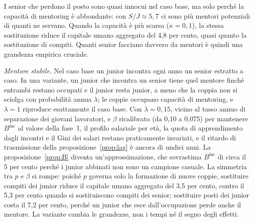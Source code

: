 \documentclass[preprint,12pt,authoryear]{elsarticle}
\begin{document}
I senior che perdono il posto sono quasi innocui nel caso base, ma solo perché la capacità di mentoring è abbondante: con $S/J\approx5{,}7$ ci sono più mentori potenziali di quanti ne servano. Quando la capacità è più scarsa ($\kappa=0{,}1$), la stessa sostituzione riduce il capitale umano aggregato del 4,8 per cento, quasi quanto la sostituzione di compiti. Quanti senior facciano davvero da mentori è quindi una grandezza empirica cruciale.

\emph{Mentore stabile.} Nel caso base un junior incontra ogni anno un senior estratto a caso. In una variante, un junior che incontra un senior tiene quel mentore finché entrambi restano occupati e il junior resta junior, a meno che la coppia non si sciolga con probabilità annua $\lambda$; le coppie occupano capacità di mentoring, e $\lambda=1$ riproduce esattamente il caso base. Con $\lambda=0{,}15$, vicino al tasso annuo di separazione dei giovani lavoratori, e $\beta$ ricalibrato (da 0,10 a 0,075) per mantenere $B^{\mathrm{inc}}$ al valore della fase~1, il profilo salariale per età, la quota di apprendimento dagli incontri e il Gini dei salari restano praticamente invariati, e il ritardo di trasmissione della proposizione~\ref{prop:lag} è ancora di undici anni. La proposizione~\ref{prop:B} diventa un'approssimazione, che sovrastima $B^{\mathrm{inc}}$ di circa il 5 per cento perché i junior abbinati non sono un campione casuale. La simmetria tra $p$ e $\beta$ si rompe: poiché $p$ governa solo la formazione di nuove coppie, sostituire compiti dei junior riduce il capitale umano aggregato del 3,5 per cento, contro il 5,3 per cento quando si sostituiscono compiti dei senior; sostituire posti dei junior costa il 7,2 per cento, perché un junior che esce dall'occupazione perde anche il mentore. La variante cambia le grandezze, non i tempi né il segno degli effetti.
\end{document}
